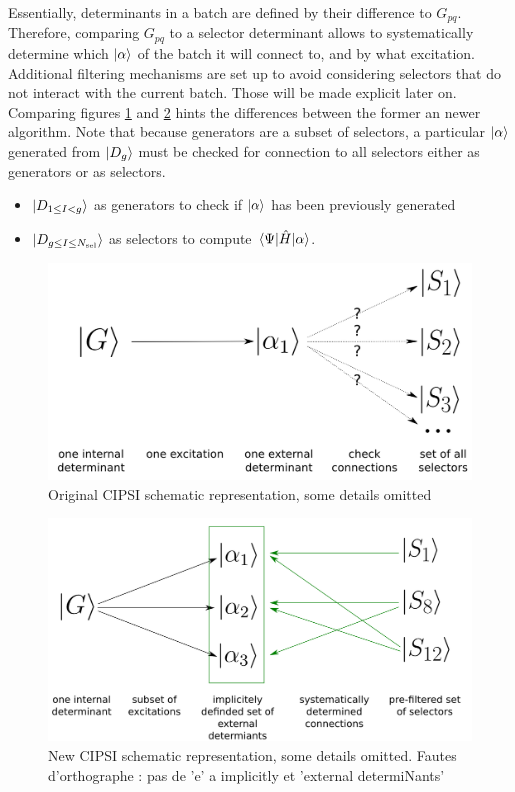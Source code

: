 \documentclass[./thesis.tex]{subfiles}
\begin{document}
Essentially, determinants in a batch are defined by their difference to $G_{pq}$. Therefore, comparing $G_{pq}$ to a selector determinant allows to systematically determine which ${\ket{\alpha}}$ of the batch it will connect to, and by what excitation. Additional filtering mechanisms are set up to avoid considering selectors that do not interact with the current batch. Those will be made explicit later on. Comparing figures \ref{fig:old_cipsi} and \ref{fig:new_cipsi} hints the differences between the former an newer algorithm. Note that because generators are a subset of selectors, a particular ${\ket{\alpha}}$ generated from $\ket {D_g}$ must be checked for connection to all selectors either as generators or as selectors.

\begin{itemize}
\item
$\ket {D_{1 \le I < g}}$ as generators to check if ${\ket{\alpha}}$ has been previously generated
\item
$\ket {D_{g \le I \le {N_\text{sel}}}}$ as selectors to compute $\mel{\Psi}{\hat{H}}{\alpha}$.
\end{itemize}


\begin{figure}[h!]
        \begin{center}
                \includegraphics[width=0.7\columnwidth]{figures/cipsi/old_cipsi}
                \caption{Original CIPSI schematic representation, some details omitted}
                \label{fig:old_cipsi}
        \end{center}
\end{figure}


\begin{figure}[h!]
        \begin{center}
                \includegraphics[width=0.8\columnwidth]{figures/cipsi/new_cipsi}
                \caption{New CIPSI schematic representation, some details omitted. 
\alert{ Fautes d'orthographe : pas de 'e' a implicitly et 'external determiNants'} }
                \label{fig:new_cipsi}
        \end{center}
\end{figure}
\end{document}
